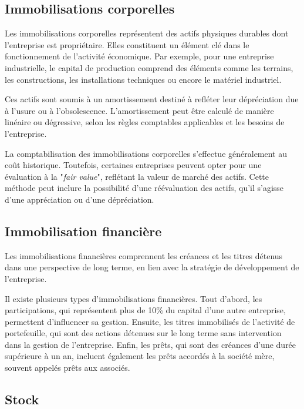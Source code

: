 \documentclass[a4paper, 12pt]{report}
\begin{document}
\subsection{Immobilisations corporelles}

Les immobilisations corporelles représentent des actifs physiques durables dont l'entreprise est propriétaire. Elles constituent un élément clé dans le fonctionnement de l'activité économique. Par exemple, pour une entreprise industrielle, le capital de production comprend des éléments comme les terrains, les constructions, les installations techniques ou encore le matériel industriel.

Ces actifs sont soumis à un amortissement destiné à refléter leur dépréciation due à l'usure ou à l'obsolescence. L'amortissement peut être calculé de manière linéaire ou dégressive, selon les règles comptables applicables et les besoins de l'entreprise. 

La comptabilisation des immobilisations corporelles s'effectue généralement au coût historique. Toutefois, certaines entreprises peuvent opter pour une évaluation à la "\textit{fair value}", reflétant la valeur de marché des actifs. Cette méthode peut inclure la possibilité d’une réévaluation des actifs, qu'il s'agisse d’une appréciation ou d’une dépréciation.

\subsection{Immobilisation financière}

Les immobilisations financières comprennent les créances et les titres détenus dans une perspective de long terme, en lien avec la stratégie de développement de l'entreprise. 

Il existe plusieurs types d'immobilisations financières. Tout d'abord, les participations, qui représentent plus de 10\% du capital d'une autre entreprise, permettent d'influencer sa gestion. Ensuite, les titres immobilisés de l'activité de portefeuille, qui sont des actions détenues sur le long terme sans intervention dans la gestion de l'entreprise. Enfin, les prêts, qui sont des créances d'une durée supérieure à un an, incluent également les prêts accordés à la société mère, souvent appelés prêts aux associés.

\subsection{Stock}
\end{document}
